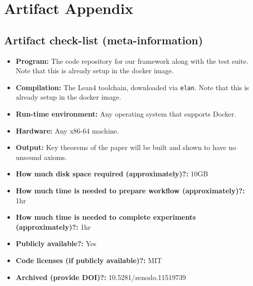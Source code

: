\documentclass{sigplanconf}
\begin{document}


\appendix
\section{Artifact Appendix}



\subsection{Artifact check-list (meta-information)}


{\small
\begin{itemize}
  \item {\bf Program: } The code repository for our framework along with the test suite. Note that this is already setup in the docker image.
  \item {\bf Compilation: } The Lean4 toolchain, downloaded via \texttt{elan}. Note that this is already setup in the docker image.
  \item {\bf Run-time environment: } Any operating system that supports Docker.
  \item {\bf Hardware: } Any x86-64 machine.
  \item {\bf Output: } Key theorems of the paper will be built and shown to have no unsound axioms.
  \item {\bf How much disk space required (approximately)?: } 10GB
  \item {\bf How much time is needed to prepare workflow (approximately)?: } 1hr
  \item {\bf How much time is needed to complete experiments (approximately)?: } 1hr
  \item {\bf Publicly available?: } Yes
  \item {\bf Code licenses (if publicly available)?: } MIT
  \item {\bf Archived (provide DOI)?: } 10.5281/zenodo.11519739
\end{itemize}
}
\end{document}
